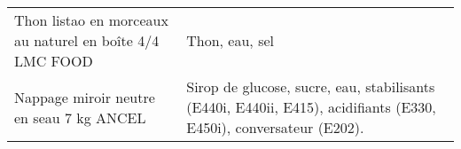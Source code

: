 \begin{longtable}{p{5cm}p{10cm}}
                                                 Thon listao en morceaux au naturel en boîte 4/4 LMC FOOD &                                                                                                                                                                                                                                                                                                                                                                                                                                                                                                                                                                                                                                                                                                                                                                                                                                                                                                                                                                                                                           Thon, eau, sel \\
                                                                 Nappage miroir neutre en seau 7 kg ANCEL &                                                                                                                                                                                                                                                                                                                                                                                                                                                                                                                                                                                                                                                                                                                                                                                                                                                                                                                        Sirop de glucose, sucre, eau, stabilisants (E440i, E440ii, E415), acidifiants (E330, E450i), conversateur (E202). \\

\end{longtable}
